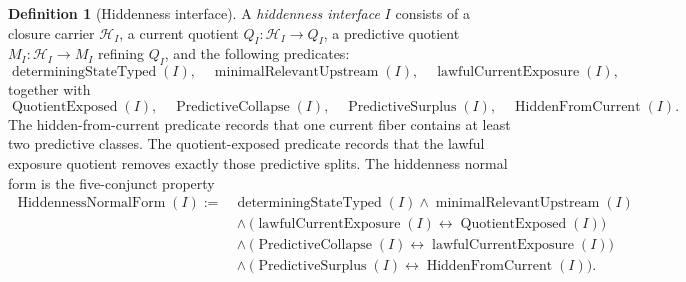 \documentclass[11pt]{article}
\newcommand{\currQ}{Q}                 \newcommand{\predM}{M}                 \newcommand{\splitObs}{\Delta}         \newcommand{\quotMap}{\pi}             \newcommand{\accessQ}{q_I}             \newcommand{\obsSig}{\sigma_I}         \newcommand{\closureForm}{\mathsf{cl}} \newcommand{\BirdInt}{\mathsf{BirdInt}}
\theoremstyle{definition}
\newtheorem{definition}[theorem]{Definition}
\begin{document}
\begin{definition}[Hiddenness interface]\label{def:hiddenness-exposure}
A \emph{hiddenness interface} \(I\) consists of a closure carrier
\(\mathcal H_I\), a current quotient
\(\currQ_I:\mathcal H_I\to Q_I\), a predictive quotient
\(\predM_I:\mathcal H_I\to M_I\) refining \(\currQ_I\), and the
following predicates:
\[
  \operatorname{determiningStateTyped}(I),\quad
  \operatorname{minimalRelevantUpstream}(I),\quad
  \operatorname{lawfulCurrentExposure}(I),
\]
together with
\[
  \operatorname{QuotientExposed}(I),\quad
  \operatorname{PredictiveCollapse}(I),\quad
  \operatorname{PredictiveSurplus}(I),\quad
  \operatorname{HiddenFromCurrent}(I).
\]
The hidden-from-current predicate records that one current fiber
contains at least two predictive classes.  The quotient-exposed
predicate records that the lawful exposure quotient removes exactly
those predictive splits.  The hiddenness normal form is the
five-conjunct property
\begin{align*}
  \operatorname{HiddennessNormalForm}(I)
  :={}&
  \operatorname{determiningStateTyped}(I)
  \wedge
  \operatorname{minimalRelevantUpstream}(I)\\
  &{}\wedge
  \bigl(\operatorname{lawfulCurrentExposure}(I)
    \leftrightarrow
    \operatorname{QuotientExposed}(I)\bigr)\\
  &{}\wedge
  \bigl(\operatorname{PredictiveCollapse}(I)
    \leftrightarrow
    \operatorname{lawfulCurrentExposure}(I)\bigr)\\
  &{}\wedge
  \bigl(\operatorname{PredictiveSurplus}(I)
    \leftrightarrow
    \operatorname{HiddenFromCurrent}(I)\bigr).
\end{align*}
\end{definition}
\end{document}
